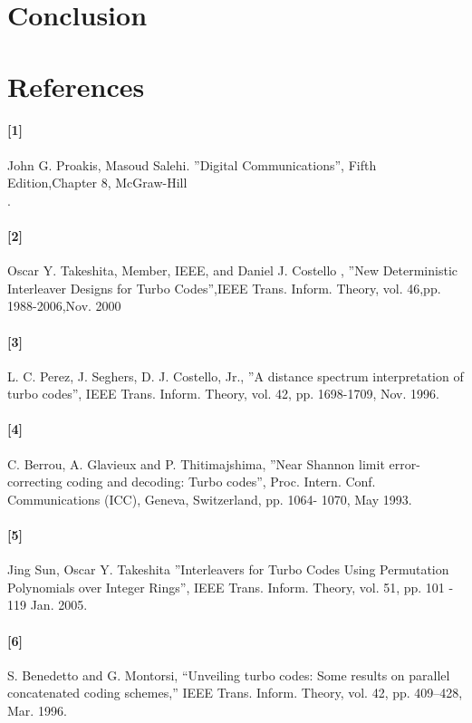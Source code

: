 \documentclass[20 pts]{article}
\begin{document}
\section{Conclusion}

\section{References}
\paragraph{[1]}   John G. Proakis, Masoud Salehi. ''Digital Communications'', 
Fifth Edition,Chapter 8, McGraw-Hill\\.
\paragraph{[2]}  Oscar Y. Takeshita, Member, IEEE, and Daniel J. Costello ,
''New Deterministic Interleaver Designs for Turbo Codes'',IEEE Trans. Inform. 
Theory, vol.  46,pp. 1988-2006,Nov. 2000\\
\paragraph{[3]}  L. C. Perez, J. Seghers, D. J. Costello, Jr.,
 ''A distance spectrum interpretation of turbo codes'', IEEE Trans. Inform. Theory, 
 vol. 42, pp. 1698-1709, Nov. 1996.\\
\paragraph{[4]}  C. Berrou, A. Glavieux and P. Thitimajshima, 
''Near Shannon limit error-correcting coding and
decoding: Turbo codes'', Proc. Intern. Conf. Communications (ICC), Geneva, 
Switzerland, pp. 1064-
1070, May 1993. \\
\paragraph{[5]}  Jing Sun, Oscar Y. Takeshita ''Interleavers for Turbo Codes Using 
Permutation Polynomials over Integer Rings'', IEEE Trans. Inform. Theory, vol. 51, 
pp. 101 - 119  Jan. 2005.\\
\paragraph{[6]} S. Benedetto and G. Montorsi, “Unveiling turbo codes: Some results
on parallel concatenated coding schemes,” IEEE Trans. Inform. Theory,
vol. 42, pp. 409–428, Mar. 1996.\\
\end{document}
